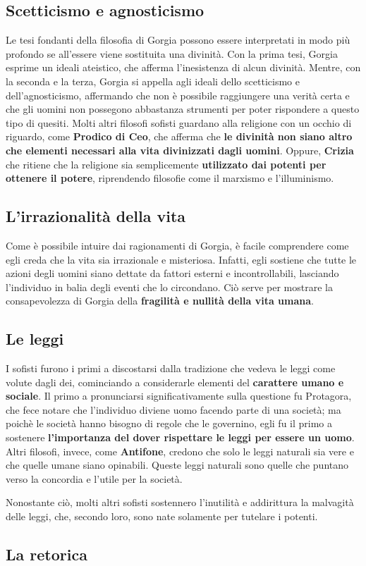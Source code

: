 \documentclass[10pt,a4paper]{article}
\begin{document}
	\subsection{Scetticismo e agnosticismo}
	
	Le tesi fondanti della filosofia di Gorgia possono essere interpretati in modo più profondo se all'essere viene sostituita una divinità. Con la prima tesi, Gorgia esprime un ideali ateistico, che afferma l'inesistenza di alcun divinità. Mentre, con la seconda e la terza, Gorgia si appella agli ideali dello scetticismo e dell'agnosticismo, affermando che non è possibile raggiungere una verità certa e che gli uomini non possegono abbastanza strumenti per poter rispondere a questo tipo di quesiti. Molti altri filosofi sofisti guardano alla religione con un occhio di riguardo, come \textbf{Prodico di Ceo}, che afferma che \textbf{le divinità non siano altro che elementi necessari alla vita divinizzati dagli uomini}. Oppure, \textbf{Crizia} che ritiene che la religione sia semplicemente \textbf{utilizzato dai potenti per ottenere il potere}, riprendendo filosofie come il marxismo e l'illuminismo.
	
	\subsection{L'irrazionalità della vita}
	
	Come è possibile intuire dai ragionamenti di Gorgia, è facile comprendere come egli creda che la vita sia irrazionale e misteriosa. Infatti, egli sostiene che tutte le azioni degli uomini siano dettate da fattori esterni e incontrollabili, lasciando l'individuo in balia degli eventi che lo circondano. Ciò serve per mostrare la consapevolezza di Gorgia della \textbf{fragilità e nullità della vita umana}.
	
	\subsection{Le leggi}
	
	I sofisti furono i primi a discostarsi dalla tradizione che vedeva le leggi come volute dagli dei, cominciando a considerarle elementi del \textbf{carattere umano e sociale}. Il primo a pronunciarsi significativamente sulla questione fu Protagora, che fece notare che l'individuo diviene uomo facendo parte di una società; ma poichè le società hanno bisogno di regole che le governino, egli fu il primo a sostenere \textbf{l'importanza del dover rispettare le leggi per essere un uomo}. Altri filosofi, invece, come \textbf{Antifone}, credono che solo le leggi naturali sia vere e che quelle umane siano opinabili. Queste leggi naturali sono quelle che puntano verso la concordia e l'utile per la società. 
	
	Nonostante ciò, molti altri sofisti sostennero l'inutilità e addirittura la malvagità delle leggi, che, secondo loro, sono nate solamente per tutelare i potenti.
	
	\subsection{La retorica}
	
	
	
\end{document}

